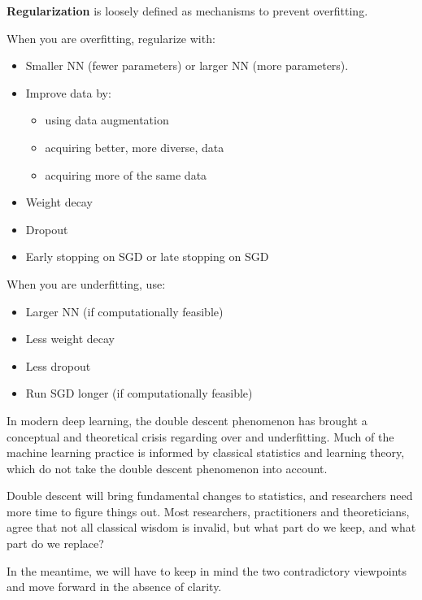 \begin{concept}
    \textbf{Regularization} is loosely defined as mechanisms to prevent overfitting.

    When you are overfitting, regularize with:

    \begin{itemize}
        \item Smaller NN (fewer parameters) or larger NN (more parameters).
        \item
        Improve data by:

        \begin{itemize}
            \item using data augmentation
            \item acquiring better, more diverse, data
            \item acquiring more of the same data
        \end{itemize}
        \item Weight decay
        \item Dropout
        \item Early stopping on SGD or late stopping on SGD
    \end{itemize}
\end{concept}

\begin{concept}
    When you are underfitting, use:

    \begin{itemize}
        \item Larger NN (if computationally feasible)
        \item Less weight decay
        \item Less dropout
        \item Run SGD longer (if computationally feasible)
    \end{itemize}
\end{concept}

\begin{concept}
    In modern deep learning, the double descent phenomenon has brought a conceptual and theoretical crisis regarding over and underfitting. Much of the machine learning practice is informed by classical statistics and learning theory, which do not take the double descent phenomenon into account.

    Double descent will bring fundamental changes to statistics, and researchers need more time to figure things out. Most researchers, practitioners and theoreticians, agree that not all classical wisdom is invalid, but what part do we keep, and what part do we replace?

    In the meantime, we will have to keep in mind the two contradictory viewpoints and move forward in the absence of clarity.
\end{concept}

